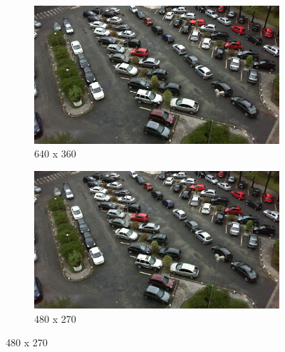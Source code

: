 \begin{appendix}
\begin{figure}[H]
    \bigskip
    \begin{subfigure}{.4\textwidth}
        \centering
        \includegraphics[width=.85\linewidth]{img/conception/image_process/downsample_only/3.png}
        \caption{640 x 360}
    \end{subfigure}%
    \begin{subfigure}{.4\textwidth}
        \centering
        \includegraphics[width=.85\linewidth]{img/conception/image_process/downsample_only/2.png}
        \caption{480 x 270}
    \end{subfigure}%


\end{figure}
\end{appendix}
